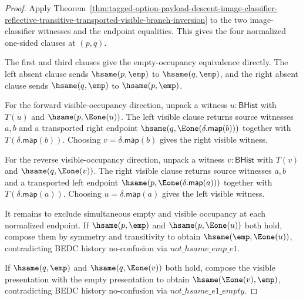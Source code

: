 \begin{proof}
Apply
Theorem~\ref{thm:tagged-option-payload-descent-image-classifier-reflective-transitive-transported-visible-branch-inversion}
to the two image-classifier witnesses and the endpoint equalities. This gives
the four normalized one-sided clauses at $(p,q)$.

The first and third clauses give the empty-occupancy equivalence directly. The
left absent clause sends $\hsame(p,\emp)$ to $\hsame(q,\emp)$, and the right
absent clause sends $\hsame(q,\emp)$ to $\hsame(p,\emp)$.

For the forward visible-occupancy direction, unpack a witness
$u:\mathsf{BHist}$ with $T(u)$ and $\hsame(p,\Eone(u))$. The left visible clause
returns source witnesses $a,b$ and a transported right endpoint
$\hsame(q,\Eone(\delta.\mathsf{map}(b)))$ together with
$T(\delta.\mathsf{map}(b))$. Choosing $v=\delta.\mathsf{map}(b)$ gives the
right visible witness.

For the reverse visible-occupancy direction, unpack a witness
$v:\mathsf{BHist}$ with $T(v)$ and $\hsame(q,\Eone(v))$. The right visible
clause returns source witnesses $a,b$ and a transported left endpoint
$\hsame(p,\Eone(\delta.\mathsf{map}(a)))$ together with
$T(\delta.\mathsf{map}(a))$. Choosing $u=\delta.\mathsf{map}(a)$ gives the left
visible witness.

It remains to exclude simultaneous empty and visible occupancy at each
normalized endpoint. If $\hsame(p,\emp)$ and $\hsame(p,\Eone(u))$ both hold,
compose them by symmetry and transitivity to obtain $\hsame(\emp,\Eone(u))$,
contradicting BEDC history no-confusion via $not\_hsame\_emp\_e1$.

If $\hsame(q,\emp)$ and $\hsame(q,\Eone(v))$ both hold, compose the visible
presentation with the empty presentation to obtain $\hsame(\Eone(v),\emp)$,
contradicting BEDC history no-confusion via $not\_hsame\_e1\_empty$.
\end{proof}

